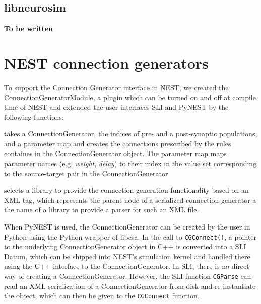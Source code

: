 \documentclass{frontiersSCNS} %
\newcommand{\tbw}[1]{{\bf\parindent0pt\color{red}#1}}
\begin{document}
\subsection{libneurosim}
\tbw{To be written}

\section{NEST connection generators}\label{sec:conn_gen_nest}

To support the Connection Generator interface in NEST, we created the
ConnectionGeneratorModule, a plugin which can be turned on and off at
compile time of NEST and extended the user interfaces SLI and PyNEST
by the following functions:

\begin{unlist}
\item[\tt CGConnect\ ] takes a ConnectionGenerator, the indices of pre-
  and a post-synaptic populations, and a parameter map and creates the
  connections prescribed by the rules containes in the
  ConnectionGenerator object. The parameter map maps parameter names
  (e.g.  \emph{weight}, \emph{delay}) to their index in the value set
  corresponding to the source-target pair in the ConnectionGenerator.
\item[\tt CGSelectImplementation\ ] selects a library to provide the
  connection generation functionality based on an XML tag, which
  represents the parent node of a serialized connection generator a
  the name of a library to provide a parser for such an XML file.
\end{unlist}


When PyNEST is used, the ConnectionGenerator can be created by the
user in Python using the Python wrapper of libcsa. In the call to
\texttt{CGConnect()}, a pointer to the underlying ConnectionGenerator
object in C++ is converted into a SLI Datum, which can be shipped into
NEST's simulation kernel and handled there using the C++ interface to
the ConnectionGenerator. In SLI, there is no direct way of creating a
ConnectionGenerator. However, the SLI function \texttt{CGParse} can
read an XML serialization of a ConnectionGenerator from disk and
re-instantiate the object, which can then be given to the
\texttt{CGConnect} function.
\end{document}
